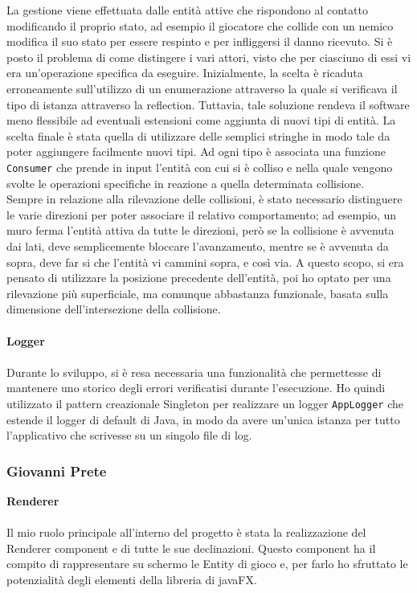 \documentclass{article}
\begin{document}
La gestione viene effettuata dalle entità attive che rispondono al contatto modificando il proprio stato, ad esempio il giocatore che collide con un nemico modifica il suo stato per essere respinto e per infliggersi il danno ricevuto.
Si è posto il problema di come distingere i vari attori, visto che per ciasciuno di essi vi era un'operazione specifica da eseguire. Inizialmente, la scelta è ricaduta erroneamente sull'utilizzo di un enumerazione attraverso la quale si verificava il tipo di istanza attraverso la reflection. Tuttavia, tale soluzione rendeva il software meno flessibile ad eventuali estensioni come aggiunta di nuovi tipi di entità.
La scelta finale è stata quella di utilizzare delle semplici stringhe in modo tale da poter aggiungere facilmente nuovi tipi. Ad ogni tipo è associata una funzione \texttt{Consumer} che prende in input l'entità con cui si è colliso e nella quale vengono svolte le operazioni specifiche in reazione a quella determinata collisione.\\
Sempre in relazione alla rilevazione delle collisioni, è stato necessario distinguere le varie direzioni per poter associare il relativo comportamento; ad esempio, un muro ferma l'entità attiva da tutte le direzioni, però se la collisione è avvenuta dai lati, deve semplicemente bloccare l'avanzamento, mentre se è avvenuta da sopra, deve far si che l'entità vi cammini sopra, e così via.
A questo scopo, si era pensato di utilizzare la posizione precedente dell'entità, poi ho optato per una rilevazione più superficiale, ma comunque abbastanza funzionale, basata sulla dimensione dell'intersezione della collisione.\\
\\
\textbf{Logger}\\
\\
Durante lo sviluppo, si è resa necessaria una funzionalità che permettesse di mantenere uno storico degli errori verificatisi durante l'esecuzione. Ho quindi utilizzato il pattern creazionale Singleton per realizzare un logger \texttt{AppLogger} che estende il logger di default di Java, in modo da avere un'unica istanza per tutto l'applicativo che scrivesse su un singolo file di log.
\newpage
\subsubsection{Giovanni Prete}
\textbf{Renderer}\\
\\
Il mio ruolo principale all'interno del progetto è stata la realizzazione del Renderer component e di tutte le sue declinazioni.
Questo component ha il compito di rappresentare su schermo le Entity di gioco e, per farlo ho sfruttato le potenzialità degli elementi della libreria di javaFX.
\end{document}
